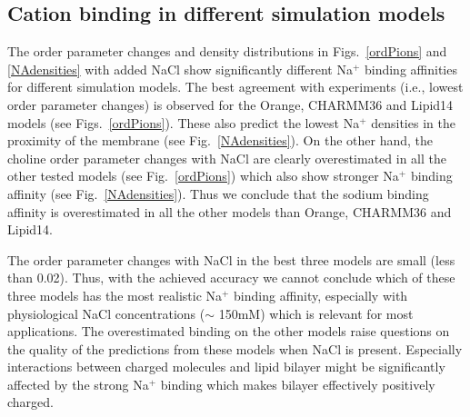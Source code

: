 \documentclass[pre,aps,floatfix,authordate1-4,twocolumn]{revtex4-1}
\begin{document}
\subsection{Cation binding in different simulation models}
The order parameter changes and density distributions in Figs.~\ref{ordPions} and \ref{NAdensities} 
with added NaCl show significantly different Na$^+$ binding affinities for different simulation models.
The best agreement with experiments (i.e., lowest order parameter changes) is observed for the Orange,
CHARMM36 and Lipid14 models (see Figs.~\ref{ordPions}). These also predict the lowest Na$^+$ densities 
in the proximity of the membrane (see Fig.~\ref{NAdensities}). On the other hand, the choline order parameter 
changes with NaCl are clearly overestimated in all the other tested models (see Fig.~\ref{ordPions}) which also
show stronger Na$^+$ binding affinity (see Fig.~\ref{NAdensities}). 
Thus we conclude that the sodium binding affinity is overestimated in all the other models than Orange, CHARMM36 and Lipid14. 

The order parameter changes with NaCl in the best three models are small (less than 0.02). Thus, with the achieved accuracy we cannot conclude 
which of these three models has the most realistic Na$^+$ binding affinity, especially with physiological NaCl concentrations ($\sim$ 150mM) 
which is relevant for most applications. 
The overestimated binding on the other models raise questions on the quality of the predictions from these models when NaCl is present.
Especially interactions between charged molecules and lipid bilayer might be significantly
affected by the strong Na$^+$ binding which makes bilayer effectively positively charged.

\end{document}
